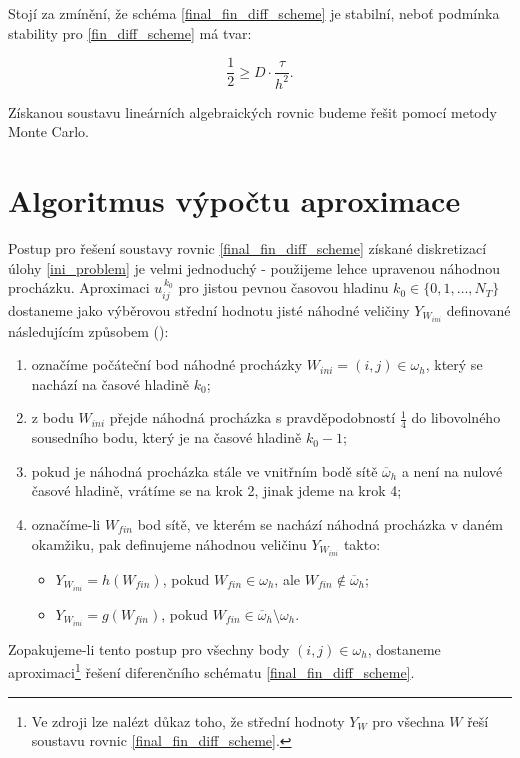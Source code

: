 \documentclass[11pt,american,czech]{article}
\newcommand*\midpoint[1]{\overline{#1}}
\begin{document}
Stojí za zmínění, že schéma \eqref{final_fin_diff_scheme} je stabilní, neboť podmínka stability pro \eqref{fin_diff_scheme} má tvar: 

\begin{equation*}
	\frac{1}{2}\geq D\cdot\frac{\tau}{h^{2}}.
\end{equation*}

Získanou soustavu lineárních algebraických rovnic budeme řešit pomocí metody Monte Carlo.

\section{Algoritmus výpočtu aproximace}\label{sec:3}

Postup pro řešení soustavy rovnic \eqref{final_fin_diff_scheme} získané diskretizací úlohy \eqref{ini_problem} je velmi jednoduchý - použijeme lehce upravenou náhodnou procházku. Aproximaci $u^{\,k_{0}}_{ij}$ pro jistou pevnou časovou hladinu $k_{0}\in\{0,1,\dots,N_{T}\}$ dostaneme jako výběrovou střední hodnotu jisté náhodné veličiny $Y_{W_{ini}}$ definované následujícím způsobem (\cite{VIRIUS2010}):

\begin{enumerate}
	\item označíme počáteční bod náhodné procházky $W_{ini}=(i,j)\in\omega_{h}$, který se nachází na časové hladině $k_{0}$;
	\item z bodu $W_{ini}$ přejde náhodná procházka s pravděpodobností $\frac{1}{4}$ do libovolného sousedního bodu, který je na časové hladině $k_{0}-1$;
	\item pokud je náhodná procházka stále ve vnitřním bodě sítě $\midpoint{\omega}_{h}$ a není na nulové časové hladině, vrátíme se na krok 2, jinak jdeme na krok 4;
	\item označíme-li $W_{fin}$ bod sítě, ve kterém se nachází náhodná procházka v daném okamžiku, pak definujeme náhodnou veličinu $Y_{W_{ini}}$ takto:
	\begin{itemize}
		\item $Y_{W_{ini}}=h(W_{fin})$, pokud $W_{fin}\in\omega_{h}$, ale $W_{fin}\notin\midpoint{\omega}_{h}$;
		\item $Y_{W_{ini}}=g(W_{fin})$, pokud $W_{fin}\in\midpoint{\omega}_{h}\setminus\omega_{h}$.
	\end{itemize}
\end{enumerate}

Zopakujeme-li tento postup pro všechny body $(i,j)\in\omega_{h}$, dostaneme aproximaci\footnote{Ve zdroji \cite{VIRIUS2010} lze nalézt důkaz toho, že střední hodnoty $Y_{W}$ pro všechna $W$ řeší soustavu rovnic \eqref{final_fin_diff_scheme}.} řešení diferenčního schématu \eqref{final_fin_diff_scheme}.
\end{document}
